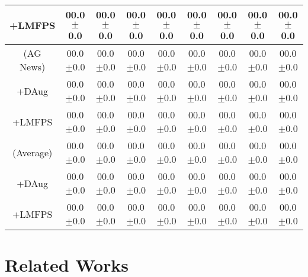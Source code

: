 \documentclass[11pt]{article}
\begin{document}
\begin{table*}
\begin{tabular}{c | c | c | c | c | c | c | c | c}
\small+LMFPS & \small00.0 \small$\pm$\small0.0 & \small00.0 \small$\pm$\small0.0 & \small00.0 \small$\pm$\small0.0 & \small00.0 \small$\pm$\small0.0 & \small00.0 \small$\pm$\small0.0 & \small00.0 \small$\pm$\small0.0 & \small00.0 \small$\pm$\small0.0 & \small00.0 \small$\pm$\small0.0\\
\hline
(AG News) & \small00.0 \small$\pm$\small0.0 & \small00.0 \small$\pm$\small0.0 & \small00.0 \small$\pm$\small0.0 & \small00.0 \small$\pm$\small0.0 & \small00.0 \small$\pm$\small0.0 & \small00.0 \small$\pm$\small0.0 & \small00.0 \small$\pm$\small0.0 & \small00.0 \small$\pm$\small0.0\\
\small+DAug & \small00.0 \small$\pm$\small0.0 & \small00.0 \small$\pm$\small0.0 & \small00.0 \small$\pm$\small0.0 & \small00.0 \small$\pm$\small0.0 & \small00.0 \small$\pm$\small0.0 & \small00.0 \small$\pm$\small0.0 & \small00.0 \small$\pm$\small0.0 & \small00.0 \small$\pm$\small0.0\\
\small+LMFPS & \small00.0 \small$\pm$\small0.0 & \small00.0 \small$\pm$\small0.0 & \small00.0 \small$\pm$\small0.0 & \small00.0 \small$\pm$\small0.0 & \small00.0 \small$\pm$\small0.0 & \small00.0 \small$\pm$\small0.0 & \small00.0 \small$\pm$\small0.0 & \small00.0 \small$\pm$\small0.0\\
\hline
\hline
(Average) & \small00.0 \small$\pm$\small0.0 & \small00.0 \small$\pm$\small0.0 & \small00.0 \small$\pm$\small0.0 & \small00.0 \small$\pm$\small0.0 & \small00.0 \small$\pm$\small0.0 & \small00.0 \small$\pm$\small0.0 & \small00.0 \small$\pm$\small0.0 & \small00.0 \small$\pm$\small0.0\\
\small+DAug & \small00.0 \small$\pm$\small0.0 & \small00.0 \small$\pm$\small0.0 & \small00.0 \small$\pm$\small0.0 & \small00.0 \small$\pm$\small0.0 & \small00.0 \small$\pm$\small0.0 & \small00.0 \small$\pm$\small0.0 & \small00.0 \small$\pm$\small0.0 & \small00.0 \small$\pm$\small0.0\\
\small+LMFPS & \small00.0 \small$\pm$\small0.0 & \small00.0 \small$\pm$\small0.0 & \small00.0 \small$\pm$\small0.0 & \small00.0 \small$\pm$\small0.0 & \small00.0 \small$\pm$\small0.0 & \small00.0 \small$\pm$\small0.0 & \small00.0 \small$\pm$\small0.0 & \small00.0 \small$\pm$\small0.0\\
\hline
\end{tabular}
\label{lmfps-vs-dataaug-vs-main-128-shot}
\end{table*}

\section{Related Works}
\end{document}
